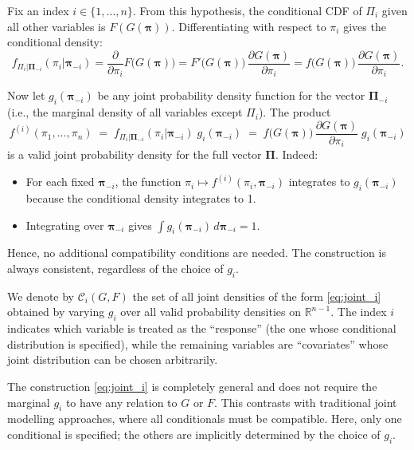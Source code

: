 Fix an index \(i\in\{1,\ldots,n\}\). From this hypothesis, the conditional CDF of \(\Pi_i\) given all other variables is \(F(G(\boldsymbol{\pi}))\). Differentiating with respect to \(\pi_i\) gives the conditional density:
\[
f_{\Pi_i|\boldsymbol{\Pi}_{-i}}(\pi_i|\boldsymbol{\pi}_{-i}) = \frac{\partial}{\partial\pi_i}F\bigl(G(\boldsymbol{\pi})\bigr) = F'\bigl(G(\boldsymbol{\pi})\bigr)\,\frac{\partial G(\boldsymbol{\pi})}{\partial\pi_i} = f\bigl(G(\boldsymbol{\pi})\bigr)\,\frac{\partial G(\boldsymbol{\pi})}{\partial\pi_i}.
\]

Now let \(g_i(\boldsymbol{\pi}_{-i})\) be any joint probability density function for the vector \(\boldsymbol{\Pi}_{-i}\) (i.e., the marginal density of all variables except \(\Pi_i\)). The product
\begin{equation}
\boxed{
f^{(i)}(\pi_1,\ldots,\pi_n) \;=\; f_{\Pi_i|\boldsymbol{\Pi}_{-i}}(\pi_i|\boldsymbol{\pi}_{-i})\; g_i(\boldsymbol{\pi}_{-i}) \;=\; f\bigl(G(\boldsymbol{\pi})\bigr)\,\frac{\partial G(\boldsymbol{\pi})}{\partial\pi_i}\; g_i(\boldsymbol{\pi}_{-i})
}
\label{eq:joint_i}
\end{equation}
is a valid joint probability density for the full vector \(\boldsymbol{\Pi}\). Indeed:
\begin{itemize}
    \item For each fixed \(\boldsymbol{\pi}_{-i}\), the function \(\pi_i \mapsto f^{(i)}(\pi_i,\boldsymbol{\pi}_{-i})\) integrates to \(g_i(\boldsymbol{\pi}_{-i})\) because the conditional density integrates to 1.
    \item Integrating over \(\boldsymbol{\pi}_{-i}\) gives \(\int g_i(\boldsymbol{\pi}_{-i})\,d\boldsymbol{\pi}_{-i}=1\).
\end{itemize}
Hence, no additional compatibility conditions are needed. The construction is always consistent, regardless of the choice of \(g_i\).

We denote by \(\mathcal{C}_i(G,F)\) the set of all joint densities of the form \eqref{eq:joint_i} obtained by varying \(g_i\) over all valid probability densities on \(\mathbb{R}^{n-1}\). The index \(i\) indicates which variable is treated as the “response” (the one whose conditional distribution is specified), while the remaining variables are “covariates” whose joint distribution can be chosen arbitrarily.

\begin{remarkbox}
\begin{remarkT}
The construction \eqref{eq:joint_i} is completely general and does not require the marginal \(g_i\) to have any relation to \(G\) or \(F\). This contrasts with traditional joint modelling approaches, where all conditionals must be compatible. Here, only one conditional is specified; the others are implicitly determined by the choice of \(g_i\).
\end{remarkT}
\end{remarkbox}

